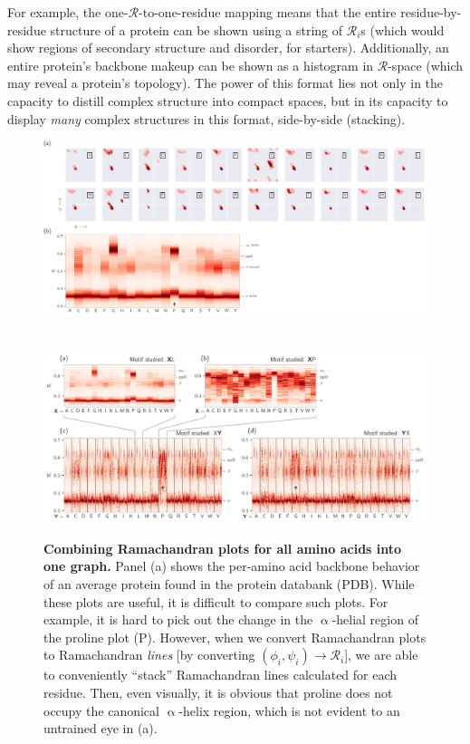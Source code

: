 \documentclass[fleqn,10pt,lineno]{wlpeerj} %
\newcommand{\n}[1]{{\color{red}#1}}
\begin{document}
For example, the one-$\mathcal{R}$-to-one-residue mapping means that the entire residue-by-residue structure of a protein can be shown using a string of $\mathcal{R}_i$s (which would show regions of secondary structure and disorder, for starters). Additionally, an entire protein's backbone makeup can be shown as a histogram in $\mathcal{R}$-space (which may reveal a protein's topology). The power of this format lies not only in the capacity to distill complex structure into compact spaces, but in its capacity to display {\it many} complex structures in this format, side-by-side (stacking).

\begin{figure}
\begin{adjustwidth}{-1in}{0in} %
\centering
\includegraphics[width=1.00\linewidth]{automated_figures/fig_ramachandran_plots_vs_numbers.pdf}
\caption{\textbf{\n{Combining Ramachandran plots for all amino acids into one graph.}}  
Panel (a) shows the per-amino acid backbone behavior of an average protein found in the protein databank (PDB). While these plots are useful, it is difficult to compare such plots. For example, it is hard to pick out the change in the $\upalpha$-helial region of the proline plot (P). However, when we convert Ramachandran plots to Rama\n{chandran} \textit{lines} [by converting $(\phi_i,\psi_i)\to\mathcal{R}_i$], we are able to conveniently ``stack'' Ramachandran lines calculated for each residue. Then, even visually, it is obvious that proline does not occupy the canonical $\upalpha$-helix region, which is not evident to an untrained eye in (a).\label{fig:peraa}}
~\vfill~
\includegraphics[width=1.00\linewidth]{automated_figures/fig_ramachandran_numbers_are_useful1.pdf}

\end{adjustwidth}
\end{figure}
\end{document}

